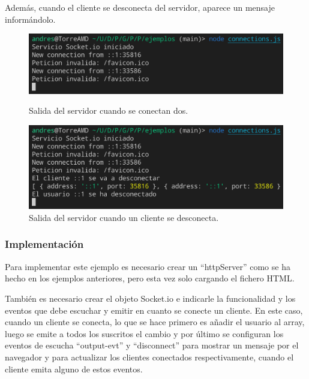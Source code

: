 \documentclass{article}
\begin{document}
Además, cuando el cliente se desconecta del servidor, aparece un mensaje informándolo.

\begin{figure}[H]
    \centering
    \begin{minipage}[H]{0.49\textwidth}
        \centering
        \includegraphics[width=\textwidth]{images/connectserver.png}
        \caption{Salida del servidor cuando se conectan dos.}
    \end{minipage}
    \hfill
    \begin{minipage}[H]{0.49\textwidth}
        \centering
        \includegraphics[width=\textwidth]{images/disconnectserver.png}
        \caption{Salida del servidor cuando un cliente se desconecta.}
    \end{minipage}
\end{figure}

\subsubsection{Implementación}
Para implementar este ejemplo es necesario crear un ``httpServer'' como se ha hecho en los ejemplos anteriores, pero esta vez solo cargando el fichero HTML.

\bigskip

También es necesario crear el objeto Socket.io e indicarle la funcionalidad y los eventos que debe escuchar y emitir en cuanto se conecte un cliente. En este caso, cuando un cliente se conecta, lo que se hace primero es añadir el usuario al array, luego se emite a todos los suscritos el cambio y por último se configuran los eventos de escucha ``output-evt'' y ``disconnect'' para mostrar un mensaje por el navegador y para actualizar los clientes conectados respectivamente, cuando el cliente emita alguno de estos eventos.
\end{document}
